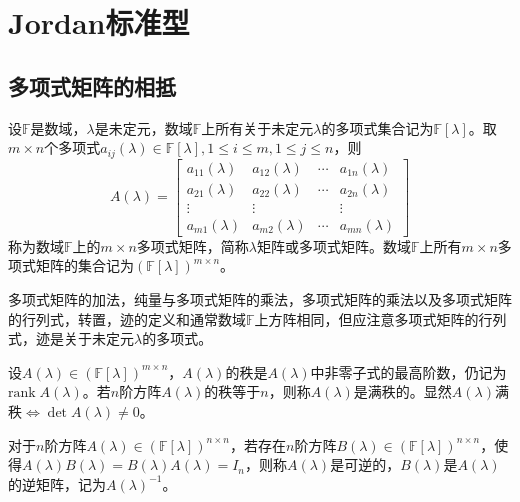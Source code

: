 \chapter{Jordan标准型}

    \section{多项式矩阵的相抵}

        \begin{definition}[多项式矩阵]
            设$\mathbb{F}$是数域，$\lambda$是未定元，数域$\mathbb{F}$上所有关于未定元$\lambda$的多项式集合记为$\mathbb{F}[\lambda]$。取$m\times n$个多项式$a_{ij}(\lambda)\in\mathbb{F}[\lambda], 1\leq i\leq m, 1\leq j \leq n$，则
            \[A(\lambda)=\begin{bmatrix}a_{11}(\lambda)&a_{12}(\lambda)&\cdots&a_{1n}(\lambda)\\a_{21}(\lambda)&a_{22}(\lambda)&\cdots&a_{2n}(\lambda)\\\vdots&\vdots&&\vdots\\a_{m1}(\lambda)&a_{m2}(\lambda)&\cdots&a_{mn}(\lambda)\end{bmatrix}\]
            称为数域$\mathbb{F}$上的$m\times n$多项式矩阵，简称$\lambda$矩阵或多项式矩阵。数域$\mathbb{F}$上所有$m\times n$多项式矩阵的集合记为$(\mathbb{F}[\lambda])^{m\times n}$。
        \end{definition}

        多项式矩阵的加法，纯量与多项式矩阵的乘法，多项式矩阵的乘法以及多项式矩阵的行列式，转置，迹的定义和通常数域$\mathbb{F}$上方阵相同，但应注意多项式矩阵的行列式，迹是关于未定元$\lambda$的多项式。

        \begin{definition}[多项式矩阵的秩]
            设$A(\lambda)\in(\mathbb{F}[\lambda])^{m\times n}$，$A(\lambda)$的秩是$A(\lambda)$中非零子式的最高阶数，仍记为$\mathrm{rank}\;A(\lambda)$。若$n$阶方阵$A(\lambda)$的秩等于$n$，则称$A(\lambda)$是满秩的。显然$A(\lambda)$满秩$\Leftrightarrow \det A(\lambda)\neq0$。
        \end{definition}

        \begin{definition}[多项式矩阵的逆矩阵]
            对于$n$阶方阵$A(\lambda)\in(\mathbb{F}[\lambda])^{n\times n}$，若存在$n$阶方阵$B(\lambda)\in(\mathbb{F}[\lambda])^{n\times n}$，使得$A(\lambda)B(\lambda)=B(\lambda)A(\lambda)=I_n$，则称$A(\lambda)$是可逆的，$B(\lambda)$是$A(\lambda)$的逆矩阵，记为$A(\lambda)^{-1}$。
        \end{definition}

